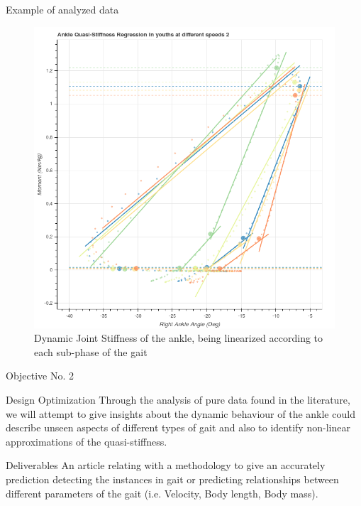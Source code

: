 \documentclass[10pt]{beamer}
\begin{document}
\begin{frame}{Example of analyzed data}
\begin{figure}[H]
\begin{centering}
\includegraphics[scale=0.25]{quasistiffness.png}
\par\end{centering}

\caption{\label{fig:N=1} Dynamic Joint Stiffness of the ankle, being linearized according to each sub-phase of the gait}

\end{figure}
\end{frame}

\begin{frame}{Objective No. 2}
	\begin{block}{Design Optimization}
	Through the analysis of pure data found in the literature, we will attempt to give insights about the dynamic behaviour of the ankle could describe unseen aspects of different types of gait and also to identify non-linear approximations of the quasi-stiffness. 
	\end{block}
	\begin{exampleblock}{Deliverables}
	An article relating with a methodology to give an accurately prediction detecting the instances in gait or predicting relationships between different parameters of the gait (i.e. Velocity, Body length, Body mass).
	\end{exampleblock}
\end{frame}
\end{document}
